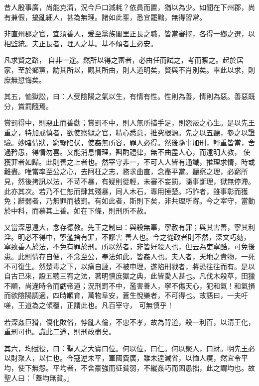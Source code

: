 \begin{pinyinscope}
 昔人殷事廣，尚能克濟，況今戶口減耗？依員而置，猶以為少。如聞在下州郡，尚有兼假，擾亂細人，甚為無理。諸如此輩，悉宜罷黜，無得習常。



 非直州郡之官，宜須善人，爰至黨族閭里正長之職，皆當審擇，各得一鄉之選，以相監統。夫正長者，理人之基。基不傾者上必安。



 凡求賢之路，
 自非一途。然所以得之審者，必由任而試之，考而察之。起於居家，至於鄉黨，訪其所以，觀其所由，則人道明矣，賢與不肖別矣。率此以求，則庶無愆悔矣。



 其五，恤獄訟，曰：人受陰陽之氣以生，有情有性。性則為善，情則為惡。善惡既分，賞罰隨焉。



 賞罰得中，則惡止而善勸；賞罰不中，則人無所措手足，則怨叛之心生。是以先王重之，特加戒慎者，欲使察獄之官，精心悉意，推究根源。先之以五聽，參之以證驗。妙睹情狀，窮鑒陷伏，使姦無所容，罪人必得。然後隨事加刑，輕重皆當，舍過矜愚，得情勿喜。又能消息情理，斟酌禮律，無不曲盡人心，而遠明大教，
 使獲罪者如歸。此則善之上者也。然宰守非一，不可人人皆有通識，推理求情，時或難盡。唯當率至公之心，去阿枉之志，務求曲直，念盡平當。聽察之理，必窮所見，然後拷訊以法，不苛不暴，有疑則從輕，未審不妄罰，隨事斷理，獄無停滯。此亦其次。若乃不仁恕而肆其殘暴，同人木石，專用捶楚。巧詐者，雖事彰而獲免；辭弱者，乃無罪而被罰。有如此者，斯則下矣，非共理所寄。今之宰守，當勤於中科，而慕其上善。如在下條，則刑所不赦。



 又當深思遠大，念存德教。先王之制曰：與殺無辜，寧赦有罪；與其害善，寧其利淫。明必不得中，寧濫捨有罪，不謬害
 善人也。今之從政者則不然，深文巧劾，寧致善人於法，不免有罪於刑。所以然者，非皆好殺人也，但云為吏寧酷，可免後患。此則情存自便，不念至公，奉法如此，皆姦人也。夫人者，天地之貴物，一死不可復生。然楚毒之下，以痛自誣，不被申理，遂陷刑戮者，將恐往往而有。是以自古已來，設五聽三宥之法，著明慎庶獄之典，此皆愛人甚也。凡伐木殺草，田獵不順，尚違時令而虧帝道；況刑罰不中，濫害善人，寧不傷天心，犯和氣！和氣損而欲陰陽調適，四時順育，萬物阜安，蒼生悅樂者，不可得也。故語曰，一夫吁嗟，王道為之傾覆，正謂此也。凡百宰守，
 可無慎乎！



 若深姦巨猾，傷化敗俗，悖亂人倫，不忠不孝，故為背道，殺一利百，以清王化，重刑可也。識此二途，則刑政盡矣。



 其六，均賦役，曰：聖人之大寶曰位。何以位，曰仁。何以聚人，曰財。明先王必以財聚人，以仁也。今寇逆未平，軍國費廣，雖未遑減省，以恤人瘼，然宜令平均，使下無怨。平均者，不舍豪強而征貧弱，不縱姦巧而困愚拙，此之謂均也。故聖人曰：「蓋均無貧。」




\end{pinyinscope}
